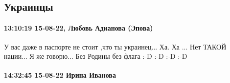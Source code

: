  
 
 
 
 


\subsection{Украинцы}

\paragraph{13:10:19 15-08-22, Любовь Адианова (Эпова)}

У вас даже в паспорте не стоит ,что ты украинец...
Ха. Ха ...
Нет ТАКОЙ нации...
Я же говорю...
Без Родины без флага
:-D :-D :-D :-D

\paragraph{14:32:45 15-08-22 Ирина Иванова}

